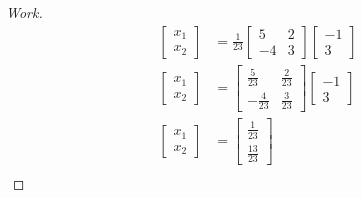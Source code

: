\documentclass{article}
\begin{document}
\begin{enumerate}
{\begin{proof}[Work]
\begin{align*}
        \begin{bmatrix}
          x_1 \\
          x_2
        \end{bmatrix} & = \frac{1}{23}
        \begin{bmatrix}
          5  & 2 \\
          -4 & 3
        \end{bmatrix}
        \begin{bmatrix}
          -1 \\
          3
        \end{bmatrix}                                     \\
        \begin{bmatrix}
          x_1 \\
          x_2
        \end{bmatrix} & =
        \begin{bmatrix}
          \frac{5}{23}  & \frac{2}{23} \\
          -\frac{4}{23} & \frac{3}{23}
        \end{bmatrix}
        \begin{bmatrix}
          -1 \\
          3
        \end{bmatrix}                                     \\
        \begin{bmatrix}
          x_1 \\
          x_2
        \end{bmatrix} & =
        \begin{bmatrix}
          \frac{1}{23} \\
          \frac{13}{23}
        \end{bmatrix}                                     \\
      \end{align*}
    \end{proof}
  }
\end{enumerate}
\end{document}
